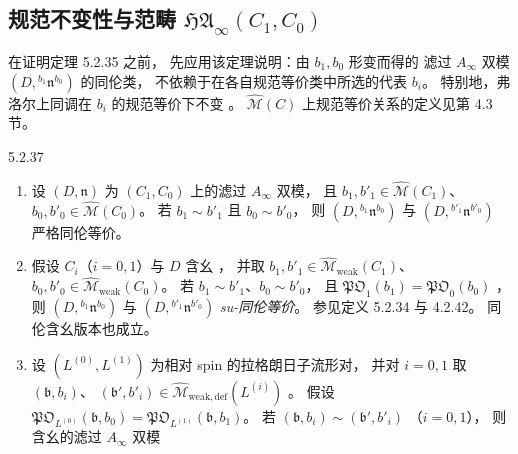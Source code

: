 
\subsection{规范不变性与范畴 $\mathfrak{HA}_\infty(C_1,C_0)$}
\label{subsec:5-2-4}

在证明定理 5.2.35 之前，
先应用该定理说明：由 $b_1,b_0$ 形变而得的
滤过 $A_\infty$ 双模
$(D,{}^{b_1}\mathfrak n^{b_0})$ 的同伦类，
不依赖于在各自规范等价类中所选的代表 $b_i$。
特别地，弗洛尔上同调在 $b_i$ 的规范等价下不变
。
$\widehat{\mathcal M}(C)$ 上规范等价关系的定义见第 4.3 节。

\begin{proposition}{5.2.37}\label{prop:5-2-37}
\begin{enumerate}[label=\textup{(\arabic*)},leftmargin=2.8em]
\item 设 $(D,\mathfrak n)$ 为
$(C_1,C_0)$ 上的滤过 $A_\infty$ 双模，
且 $b_1,b'_1\in\widehat{\mathcal M}(C_1)$、
$b_0,b'_0\in\widehat{\mathcal M}(C_0)$。
若 $b_1\sim b'_1$ 且 $b_0\sim b'_0$，
则 $(D,{}^{b_1}\mathfrak n^{b_0})$
与 $(D,{}^{b'_1}\mathfrak n^{b'_0})$
严格同伦等价。
\item 假设 $C_i$（$i=0,1$）与 $D$ 含幺
，
并取
$b_1,b'_1\in\widehat{\mathcal M}_{\mathrm{weak}}(C_1)$、
$b_0,b'_0\in\widehat{\mathcal M}_{\mathrm{weak}}(C_0)$。
若 $b_1\sim b'_1$、$b_0\sim b'_0$，
且
$\mathfrak{PO}_1(b_1)=\mathfrak{PO}_0(b_0)$
，
则 $(D,{}^{b_1}\mathfrak n^{b_0})$
与 $(D,{}^{b'_1}\mathfrak n^{b'_0})$
\emph{su-同伦等价}。
参见定义 5.2.34 与 4.2.42。
同伦含幺版本也成立。
\item 设 $(L^{(0)},L^{(1)})$
为相对 spin 的拉格朗日子流形对，
并对 $i=0,1$ 取
$(\mathfrak b,b_i)$、
$(\mathfrak b',b'_i)
\in\widehat{\mathcal M}_{\mathrm{weak,def}}
(L^{(i)})$
。
假设
$\mathfrak{PO}_{L^{(0)}}(\mathfrak b,b_0)
=\mathfrak{PO}_{L^{(1)}}(\mathfrak b,b_1)$。
若
$(\mathfrak b,b_i)\sim
(\mathfrak b',b'_i)$
（$i=0,1$），
则含幺的滤过 $A_\infty$ 双模
\end{enumerate}
\end{proposition}
